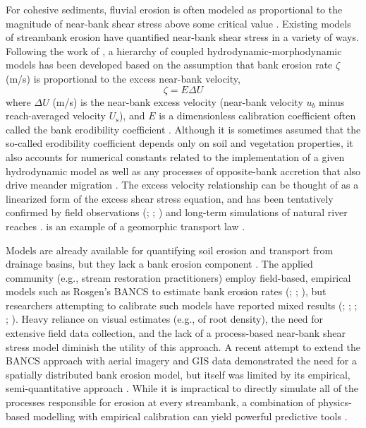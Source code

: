 \documentclass[preprint, review, authoryear, 12pt]{elsarticle}
\begin{document}
For cohesive sediments, fluvial erosion is often modeled as proportional to the magnitude of near-bank shear stress above some critical value \citep{Partheniades1965}. Existing models of streambank erosion have quantified near-bank shear stress in a variety of ways. Following the work of \citet{Ikeda1981}, a hierarchy of coupled hydrodynamic-morphodynamic models has been developed based on the assumption that bank erosion rate $\zeta$ (m/s) is proportional to the excess near-bank velocity,
\begin{equation}\label{eq:ikeda}
\zeta = E \Delta U
\end{equation}
where $\Delta U$ (m/s) is the near-bank excess velocity (near-bank velocity $u_b$ minus reach-averaged velocity $U_\text{s}$), and $E$ is a dimensionless calibration coefficient often called the bank erodibility coefficient \citep{Camporeale2007}. Although it is sometimes assumed that the so-called erodibility coefficient depends only on soil and vegetation properties, it also accounts for numerical constants related to the implementation of a given hydrodynamic model \citep{Mosselman2014} as well as any processes of opposite-bank accretion that also drive meander migration \citep{Crosato2009,Parker2011}. The excess velocity relationship can be thought of as a linearized form of the excess shear stress equation, and has been tentatively confirmed by field observations (\citealp{Odgaard1987}; \citealp{Odgaard1989a}; \citealp{Pizzuto1989}) and long-term simulations of natural river reaches \citep{Matsubara2014}.  is an example of a geomorphic transport law \citep{Dietrich2003}.

Models are already available for quantifying soil erosion and transport from drainage basins, but they lack a bank erosion component \citep{DeVente2013}. The applied community (e.g., stream restoration practitioners) employ field-based, empirical models such as Rosgen's BANCS to estimate bank erosion rates (\citealp{Rosgen2001}; \citealp{Simon2007}; \citealp{Rosgen2009}), but researchers attempting to calibrate such models have reported mixed results (\citealp{Harmel1999}; \citealp{VanEps2004}; \citealp{Sass2012}; \citealp{Kwan2014a}; \citealp{McMillan2016}). Heavy reliance on visual estimates (e.g., of root density), the need for extensive field data collection, and the lack of a process-based near-bank shear stress model diminish the utility of this approach. A recent attempt to extend the BANCS approach with aerial imagery and GIS data demonstrated the need for a spatially distributed bank erosion model, but itself was limited by its empirical, semi-quantitative approach \citep{Bandyopadhyay2014}. While it is impractical to directly simulate all of the processes responsible for erosion at every streambank, a combination of physics-based modelling with empirical calibration can yield powerful predictive tools \citep[e.g.,][]{Pelletier2012}.
\end{document}
